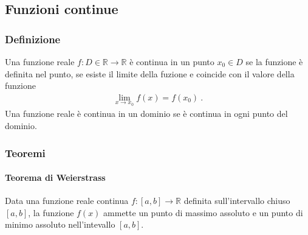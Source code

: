 \documentclass[letterpaper,10pt,english]{jupyterBook}
\begin{document}
\subsection{Funzioni continue}
\label{\detokenize{ch/infinitesimal_calculus/analysis:funzioni-continue}}\label{\detokenize{ch/infinitesimal_calculus/analysis:infinitesimal-calculus-continuous-fun}}

\subsubsection{Definizione}
\label{\detokenize{ch/infinitesimal_calculus/analysis:infinitesimal-calculus-continuous-fun-def}}\label{\detokenize{ch/infinitesimal_calculus/analysis:id1}}
\sphinxAtStartPar
Una funzione reale \(f: D \in \mathbb{R} \rightarrow \mathbb{R}\) è continua in un punto \(x_0 \in D\) se la funzione è definita nel punto, se esiste il limite della fuzione e coincide con il valore della funzione
\begin{equation*}
\begin{split}\lim_{x \rightarrow x_0} f(x) = f(x_0) \ .\end{split}
\end{equation*}
\sphinxAtStartPar
Una funzione reale è continua in un dominio  se è continua in ogni punto del dominio.


\subsubsection{Teoremi}
\label{\detokenize{ch/infinitesimal_calculus/analysis:teoremi}}\label{\detokenize{ch/infinitesimal_calculus/analysis:infinitesimal-calculus-continuous-fun-thms}}

\paragraph{Teorema di Weierstrass}
\label{\detokenize{ch/infinitesimal_calculus/analysis:teorema-di-weierstrass}}\label{\detokenize{ch/infinitesimal_calculus/analysis:infinitesimal-calculus-continuous-fun-thms-weierstrass}}
\sphinxAtStartPar
Data una funzione reale continua \(f: [a,b] \rightarrow \mathbb{R}\) definita sull’intervallo chiuso \([a,b]\), la funzione \(f(x)\) ammette un punto di massimo assoluto e un punto di minimo assoluto nell’intevallo \([a,b]\).

\sphinxAtStartPar
{} 
\end{document}
